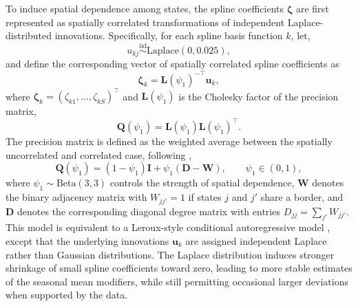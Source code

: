 \documentclass[11pt]{article}
\begin{document}
To induce spatial dependence among states, the spline coefficients $\bm{\zeta}$ are first represented as spatially correlated transformations of independent Laplace-distributed innovations. Specifically, for each spline basis function $k$, let,
\begin{equation}
u_{kj}
\overset{\mathrm{iid}}{\sim}
\text{Laplace}\left(0, 0.025\right),
\end{equation}
and define the corresponding vector of spatially correlated spline coefficients as
\begin{equation}
\bm{\zeta}_k
=
\bm{L}(\psi_1)^{-\top}\bm{u}_k,
\end{equation}
where $\bm{\zeta}_k = (\zeta_{k1},\ldots,\zeta_{kS})^\top$ and $\bm{L}(\psi_1)$ is the Cholesky factor of the precision matrix,
\begin{equation}
\bm{Q}(\psi_1)
=
\bm{L}(\psi_1)\bm{L}(\psi_1)^\top.
\end{equation}
The precision matrix is defined as the weighted average between the spatially uncorrelated and correlated case, following \citep{leroux2000},
\begin{equation}
\bm{Q}(\psi_1)
=
(1-\psi_1)\bm{I}
+
\psi_1(\bm{D}-\bm{W}),
\qquad
\psi_1 \in (0,1),
\end{equation}
where $\psi_1 \sim \text{Beta}(3,3)$ controls the strength of spatial dependence, $\bm{W}$ denotes the binary adjacency matrix with $W_{jj'}=1$ if states $j$ and $j'$ share a border, and $\bm{D}$ denotes the corresponding diagonal degree matrix with entries $D_{jj}=\sum_{j'}W_{jj'}$.\\

This model is equivalent to a Leroux-style conditional autoregressive model \citep{leroux2000}, except that the underlying innovations $\bm{u}_k$ are assigned independent Laplace rather than Gaussian distributions. The Laplace distribution induces stronger shrinkage of small spline coefficients toward zero, leading to more stable estimates of the seasonal mean modifiers, while still permitting occasional larger deviations when supported by the data.


\end{document}
